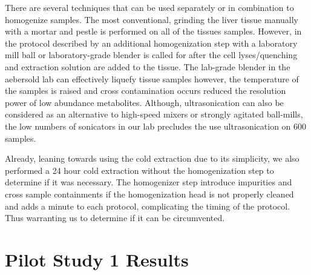 \documentclass[a4paper]{book}
\begin{document}
	There are several techniques that can be used separately or in combination to homogenize samples. The most conventional, grinding the liver tissue manually with a mortar and pestle is performed on all of the tissues samples. However, in the protocol described by \citeauthor{Williams2016SystemsFunction} an additional homogenization step with a laboratory mill ball or laboratory-grade blender is called for after the cell lyses/quenching and extraction solution are added to the tissue. The lab-grade blender in the aebersold lab can effectively liquefy tissue samples however, the temperature of the samples is raised and cross contamination occurs reduced the resolution power of low abundance metabolites. Although, ultrasonication can also be considered as an alternative to high-speed mixers or strongly agitated ball-mills, the low numbers of sonicators in our lab precludes the use  ultrasonication on 600 samples.
	
	Already, leaning towards using the cold extraction due to its simplicity, we also performed a 24 hour cold extraction without the homogenization step to determine if it was necessary. The homogenizer step introduce impurities and cross sample containments if the homogenization head is not properly cleaned and adds a minute to each protocol, complicating the timing of the protocol. Thus warranting us to determine if it can be circumvented.
	
	\section{Pilot Study 1 Results}
	
\end{document}
